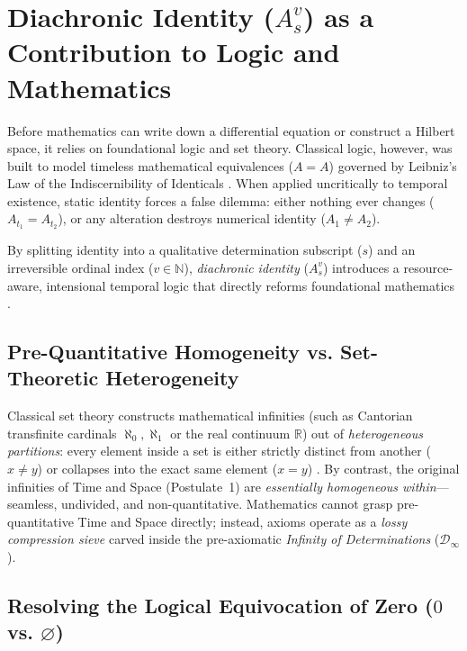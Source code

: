 \documentclass[11pt,a4paper]{article}
\begin{document}
\section{Diachronic Identity ($A_s^v$) as a Contribution to Logic and Mathematics}

Before mathematics can write down a differential equation or construct a Hilbert space, it relies on foundational logic and set theory. Classical logic, however, was built to model timeless mathematical equivalences ($A = A$) governed by Leibniz's Law of the Indiscernibility of Identicals \cite{Leibniz1686, Prior1967}. When applied uncritically to temporal existence, static identity forces a false dilemma: either nothing ever changes ($A_{t_1} = A_{t_2}$), or any alteration destroys numerical identity ($A_1 \neq A_2$).

By splitting identity into a qualitative determination subscript ($s$) and an irreversible ordinal index ($v \in \mathbb{N}$), \emph{diachronic identity} ($A_s^v$) introduces a resource-aware, intensional temporal logic that directly reforms foundational mathematics \cite{Brouwer1913, Girard1987}.

\subsection{Pre-Quantitative Homogeneity vs. Set-Theoretic Heterogeneity}

Classical set theory constructs mathematical infinities (such as Cantorian transfinite cardinals $\aleph_0, \aleph_1$ or the real continuum $\mathbb{R}$) out of \emph{heterogeneous partitions}: every element inside a set is either strictly distinct from another ($x \neq y$) or collapses into the exact same element ($x = y$) \cite{Cantor1895, Godel1931}. By contrast, the original infinities of Time and Space (Postulate~1) are \emph{essentially homogeneous within}---seamless, undivided, and non-quantitative. Mathematics cannot grasp pre-quantitative Time and Space directly; instead, axioms operate as a \emph{lossy compression sieve} carved inside the pre-axiomatic \emph{Infinity of Determinations} ($\mathcal{D}_\infty$).

\subsection{Resolving the Logical Equivocation of Zero ($0$ vs. $\varnothing$)}
\end{document}
